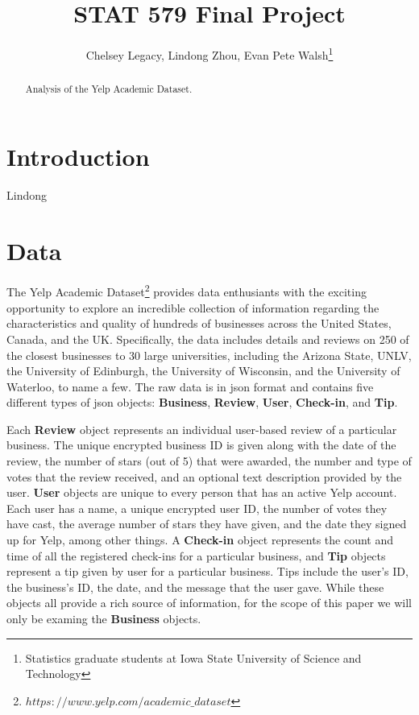 \documentclass[11pt]{article}
\begin{document}
\author{Chelsey Legacy, Lindong Zhou, Evan Pete Walsh\footnote{Statistics graduate students at Iowa State University of Science and Technology}}
\title{STAT 579 Final Project}
\maketitle

\begin{abstract}
Analysis of the Yelp Academic Dataset.
\end{abstract}

\newpage

\tableofcontents

\newpage

\pagestyle{fancy}
\rhead{\thepage}
\rfoot{\today}
\cfoot{}%


\section{Introduction}

Lindong


\section{Data}


The Yelp Academic Dataset\footnote{$https://www.yelp.com/academic\_dataset$} provides data enthusiants with the exciting opportunity to explore an incredible collection of information regarding the characteristics and quality of hundreds of businesses across the United States, Canada, and the UK. Specifically, the data includes details and reviews on 250 of the closest businesses to 30 large universities, including the Arizona State, UNLV, the University of Edinburgh, the University of Wisconsin, and the University of Waterloo, to name a few. The raw data is in json format and contains five different types of json objects: \textbf{Business}, \textbf{Review}, \textbf{User}, \textbf{Check-in}, and \textbf{Tip}.

Each \textbf{Review} object represents an individual user-based review of a particular business. The unique encrypted business ID is given along with the date of the review, the number of stars (out of 5) that were awarded, the number and type of votes that the review received, and an optional text description provided by the user. \textbf{User} objects are unique to every person that has an active Yelp account. Each user has a name, a unique encrypted user ID, the number of votes they have cast, the average number of stars they have given, and the date they signed up for Yelp, among other things. A \textbf{Check-in} object represents the count and time of all the registered check-ins for a particular business, and \textbf{Tip} objects represent a tip given by user for a particular business. Tips include the user's ID, the business's ID, the date, and the message that the user gave. While these objects all provide a rich source of information, for the scope of this paper we will only be examing the \textbf{Business} objects.
\end{document}

